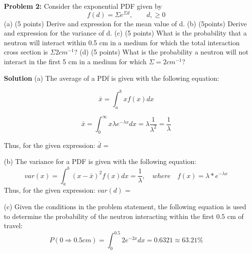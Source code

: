 \documentclass{amsart}
\theoremstyle{definition}
\begin{document}
 
\newpage
\textbf{Problem 2:} Consider the exponential PDF given by
\begin{equation*}
    f(d) = \Sigma e^{\Sigma d}, \qquad d,\geq 0
\end{equation*}
(a) (5 points) Derive and expression for the mean value of d. \newline
(b) (5points) Derive and expression for the variance of d. \newline
(c) (5 points) What is the probability that a neutron will interact within 0.5 cm in a medium for which the total interaction cross section is $\Sigma 2 cm^{-1}$? \newline
(d) (5 points) What is the probability a neutron will not interact in the first 5 cm in a medium for which $\Sigma = 2 cm^{-1}$? \newline


\textbf{Solution}
\bigbreak
(a) The average of a PDf is given with the following equation:

$$ \bar{x} = \int_a^b x f(x) dx $$

$$ \bar{x} = \int_{0}^{\infty}{x\lambda e^{-\lambda x}dx} = \lambda \frac{1}{\lambda^2} = \frac{1}{\lambda} $$


Thus, for the given expression: $\bar{d}$ = 


(b) The variance for a PDF is given with the following equation:
\bigbreak
\begin{equation*}
    var(x) = \int_{a}^{b}{(x-\bar{x})^2f(x)dx} = \frac{1}{\lambda}, \quad where \quad f(x) = \lambda*e^{-\lambda x}
\end{equation*}
\bigbreak
Thus, for the given expression: $var(d)$ = 
\bigbreak


(c) Given the conditions in the problem statement, the following equation is used to determine the probability of the neutron interacting within the first 0.5 cm of travel:
\bigbreak
\begin{equation*}
    P(0\Rightarrow0.5cm) = \int_{0}^{0.5}2e^{-2x}dx = 0.6321 \approx \boxed{63.21\%}
\end{equation*}
\bigbreak
\end{document}
